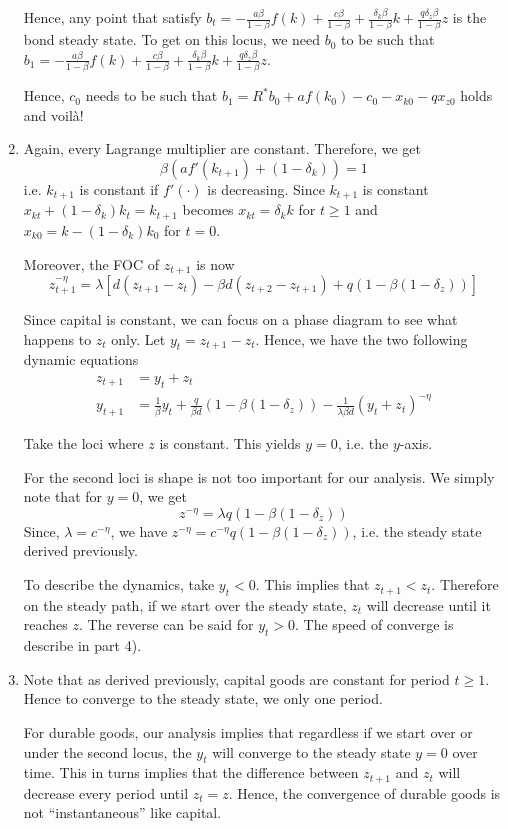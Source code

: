 \documentclass[12pt]{article}
\newcommand{\1}{{\bf 1}} %
\begin{document}
\begin{enumerate}[(1)]
Hence, any point that satisfy $b_{t}=-\frac{a\beta}{1-\beta}f(k)+ \frac{c\beta}{1-\beta}+ \frac{\delta_k\beta}{1-\beta}k+\frac{q\delta_z\beta}{1-\beta} z$ is the bond steady state. To get on this locus, we need $b_0$ to be such that $b_1 = -\frac{a\beta}{1-\beta}f(k)+ \frac{c\beta}{1-\beta}+ \frac{\delta_k\beta}{1-\beta}k+\frac{q\delta_z\beta}{1-\beta} z$.

Hence, $c_0$ needs to be such that $b_{1}=R^*b_0+af(k_0)- c_0-x_{k0}-qx_{z0}$ holds and voil\`a!

	\item 
	
	Again, every Lagrange multiplier are constant. Therefore, we get
	\[
	\beta(af'(k_{t+1})+(1-\delta_k))=1
	\]
	i.e. $k_{t+1}$ is constant if $f'(\cdot)$ is decreasing. Since $k_{t+1}$ is constant $x_{kt}+(1-\delta_k)k_t= k_{t+1}$ becomes $x_{kt}=\delta_kk$ for $t\geq 1$ and $x_{k0}=k-(1-\delta_k)k_0$ for $t=0$.
	
	Moreover, the FOC of $z_{t+1}$ is now
	\[
	z_{t+1}^{-\eta}= \lambda [d(z_{t+1}-z_t)-\beta d(z_{t+2}-z_{t+1})+q(1- \beta (1-\delta_z) )]
	\]
	
	Since capital is constant, we can focus on a phase diagram to see what happens to $z_t$ only. Let $y_t= z_{t+1}-z_t$. Hence, we have the two following dynamic equations
	\begin{align*}
		z_{t+1} & = y_t + z_t\\
	y_{t+1}&= \frac{1}{\beta }y_{t} + \frac{q}{\beta d}(1- \beta (1-\delta_z) ) -\frac{1}{\lambda \beta d}(y_{t}+z_{t})^{-\eta}
	\end{align*}
	
	Take the loci where $z$ is constant. This yields $y=0$, i.e. the $y$-axis.
	
	For the second loci is shape is not too important for our analysis. We simply note that for $y=0$, we get
	\[
		z ^{-\eta} = \lambda q(1-\beta(1-\delta_z))
	\]
	Since, $\lambda = c^{-\eta}$, we have $z ^{-\eta} = c^{-\eta} q(1-\beta(1-\delta_z))$, i.e. the steady state derived previously.
	
	To describe the dynamics, take $y_t<0$. This implies that $z_{t+1}<z_t$. Therefore on the steady path, if we start over the steady state, $z_t$ will decrease until it reaches $z$. The reverse can be said for $y_t>0$. The speed of converge is describe in part 4).

	\item 
	
	Note that as derived previously, capital goods are constant for period $t\geq 1$. Hence to converge to the steady state, we only one period.
	
	For durable goods, our analysis implies that regardless if we start over or under the second locus, the $y_t$ will converge to the steady state $y=0$ over time. This in turns implies that the difference between $z_{t+1}$ and $z_{t}$ will decrease every period until $z_t=z$. Hence, the convergence of durable goods is not ``instantaneous'' like capital.
\end{enumerate}
	
\end{document}
